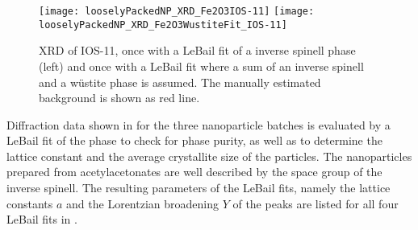 \documentclass[\main/dresen_thesis.tex]{subfiles}
\begin{document}
  \label{sec:looselyPackedNS:nanoparticle:xrd}
  \begin{figure}[tb]
    \centering
    \texttt{[image: looselyPackedNP\_XRD\_Fe2O3IOS-11]}
    \texttt{[image: looselyPackedNP\_XRD\_Fe2O3WustiteFit\_IOS-11]}
    \caption{\label{fig:monolayers:nanoparticle:xrd}XRD of IOS-11, once with a LeBail fit of a inverse spinell phase (left) and once with a LeBail fit where a sum of an inverse spinell and a w\"ustite phase is assumed. The manually estimated background is shown as red line.}
  \end{figure}

  Diffraction data shown in  for the three nanoparticle batches is evaluated by a LeBail fit of the phase to check for phase purity, as well as to determine the lattice constant and the average crystallite size of the particles.
  The nanoparticles prepared from acetylacetonates are well described by the space group of the inverse spinell.
  The resulting parameters of the LeBail fits, namely the lattice constants $a$ and the Lorentzian broadening $Y$ of the peaks are listed for all four LeBail fits in .
\end{document}
